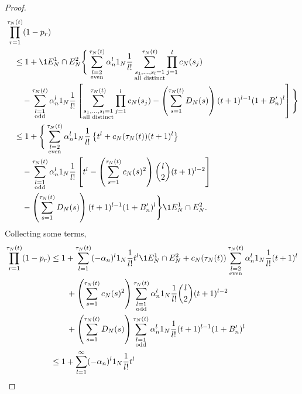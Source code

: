 \begin{proof}
\begin{align*}
&\prod_{r=1}^{\tau_N(t)} (1-p_r) \\
&\quad\leq 1 + \1{E_N^1 \cap E_N^2} \Bigg\{ 
        \sum_{\substack{l=2 \\ \text{even} }}^{\tau_N(t)} 
        \alpha_n^l \ON \frac{1}{l!} 
        \sum_{\substack{ s_1, \dots, s_l =1 \\ \text{all distinct} }}^{\tau_N(t)}
        \prod_{j=1}^l c_N(s_j) \\
    &\qquad- \sum_{\substack{l=1 \\ \text{odd} }}^{\tau_N(t)} 
        \alpha_n^l \ON \frac{1}{l!} 
        \left[ \sum_{\substack{ s_1, \dots, s_l =1 \\ \text{all distinct} }}^{\tau_N(t)}
        \prod_{j=1}^l c_N(s_j)
        - \left( \sum_{s=1}^{\tau_N(t)} D_N(s) \right) 
        (t+1)^{l-1} (1+B_n^\prime)^l \right] \Bigg\} \\
&\quad\leq 1 + \Bigg\{ \sum_{\substack{l=2 \\ \text{even} }}^{\tau_N(t)} 
        \alpha_n^l \ON \frac{1}{l!} 
        \left\{ t^l + c_N(\tau_N(t)) (t+1)^l \right\} \\
    &\qquad- \sum_{\substack{l=1 \\ \text{odd} }}^{\tau_N(t)} 
        \alpha_n^l \ON \frac{1}{l!} 
        \left[ t^l - \left( \sum_{s=1}^{\tau_N(t)} c_N(s)^2 \right) 
        \binom{l}{2} (t+1)^{l-2} \right] \\
    &\qquad- \left( \sum_{s=1}^{\tau_N(t)} D_N(s) \right) 
        (t+1)^{l-1} (1+B_n^\prime)^l \Bigg\} \1{E_N^1 \cap E_N^2} .
\end{align*}
Collecting some terms,
\begin{align}
\prod_{r=1}^{\tau_N(t)} (1-p_r)
&\leq 1+ \sum_{l=1}^{\tau_N(t)} (-\alpha_n)^l \ON \frac{1}{l!} t^l 
        \1{E_N^1 \cap E_N^2}
        + c_N(\tau_N(t)) \sum_{\substack{l=2 \\ \text{even} }}^{\tau_N(t)}
        \alpha_n^l \ON \frac{1}{l!} (t+1)^l \notag\\
    &\qquad+ \left( \sum_{s=1}^{\tau_N(t)} c_N(s)^2 \right)
        \sum_{\substack{l=1 \\ \text{odd} }}^{\tau_N(t)} \alpha_n^l
        \ON \frac{1}{l!} \binom{l}{2} (t+1)^{l-2} \notag\\
    &\qquad+ \left( \sum_{s=1}^{\tau_N(t)} D_N(s) \right) 
        \sum_{\substack{l=1 \\ \text{odd} }}^{\tau_N(t)} \alpha_n^l
        \ON \frac{1}{l!} (t+1)^{l-1} (1+B_n^\prime)^l \notag\\
&\leq 1+ \sum_{l=1}^{\infty} (-\alpha_n)^l \ON \frac{1}{l!} t^l

\end{align}
\end{proof}
